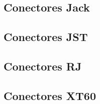 
\subsection{Conectores Jack}


\subsection{Conectores JST}


\subsection{Conectores RJ}


\subsection{Conectores XT60}




